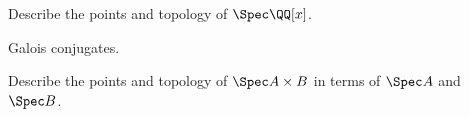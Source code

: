 \begin{problem}
	[{$\Spec \QQ[x]$}]
	Describe the points and topology of $\Spec \QQ[x]$.
	\begin{hint}
		Galois conjugates.
	\end{hint}
\end{problem}

\begin{problem}
	Describe the points and topology of $\Spec A \times B$
	in terms of $\Spec A$ and $\Spec B$.
\end{problem}

\endinput

\begin{problem}
	[From Andrew Critch]
	\onechili
	Let $A$ be a Noetherian ring.
	Show that $A$ is an integral domain if and only if it has no idempotents,
	and $A_\kp$ is an integral domain for every prime $\kp$.
	\begin{hint}
		Show that if $\Spec A$ is connected and its stalks are irreducible,
		then $\Spec A$ is itself irreducible.
		Consider nilradical $N = \sqrt{(0)}$.
	\end{hint}
	\begin{sol}
		This is the proposition on the second page of
		\url{https://www.acritch.com/media/math/Stalk-local_detection_of_irreducibility.pdf}
	\end{sol}
\end{problem}
